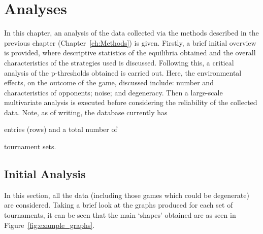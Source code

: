 \chapter{Analyses}\label{ch:Analyses}
In this chapter, an analysis of the data collected via the methods described in
the previous chapter (Chapter~\ref{ch:Methods}) is given. Firstly, a brief
initial overview is provided, where descriptive statistics of the equilibria
obtained and the overall characteristics of the strategies used is discussed.
Following this, a critical analysis of the p-thresholds obtained is carried out.
Here, the environmental effects, on the outcome of the game, discussed include:
number and characteristics of opponents; noise; and degeneracy. Then a
large-scale multivariate analysis is executed before considering the reliability
of the collected data. Note, as of writing, the database currently has 

entries (rows) and a total number of 

tournament sets. 

\section{Initial Analysis}\label{sec:Initial_Analysis}
In this section, all the data (including those games which could be degenerate)
are considered. Taking a brief look at the graphs produced for each set of
tournaments, it can be seen that the main `shapes' obtained are as seen in
Figure~\ref{fig:example_graphs}.

